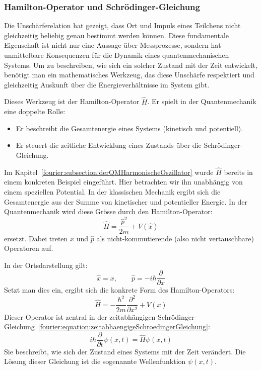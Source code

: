 	\subsubsection{Hamilton-Operator und Schrödinger-Gleichung%
	\label{fourier:subsubsection:hamiltonOperatorUndSchroedinger}}
		Die Unschärferelation hat gezeigt, dass Ort und Impuls eines Teilchens nicht gleichzeitig beliebig genau bestimmt werden können.
		Diese fundamentale Eigenschaft ist nicht nur eine Aussage über Messprozesse,
		sondern hat unmittelbare Konsequenzen für die Dynamik eines quantenmechanischen Systems.
		Um zu beschreiben, wie sich ein solcher Zustand mit der Zeit entwickelt,
		benötigt man ein mathematisches Werkzeug, das diese Unschärfe respektiert
		und gleichzeitig Auskunft über die Energieverhältnisse im System gibt.
		
		Dieses Werkzeug ist der Hamilton-Operator \( \hat{H} \).
		Er spielt in der Quantenmechanik eine doppelte Rolle:
		\begin{itemize}
		\item Er beschreibt die Gesamtenergie eines Systems (kinetisch und potentiell).
		\item Er steuert die zeitliche Entwicklung eines Zustands über die Schrödinger-Gleichung.
		\end{itemize}
		Im Kapitel~\ref{fourier:subsection:derQMHarmonischeOszillator} wurde \( \hat{H} \) bereits in einem konkreten Beispiel eingeführt.
		Hier betrachten wir ihn unabhängig von einem speziellen Potential.
		In der klassischen Mechanik ergibt sich die Gesamtenergie aus der Summe von kinetischer und potentieller Energie.
		In der Quantenmechanik wird diese Grösse durch den Hamilton-Operator:
		\begin{equation}\label{fourier:equation:HamiltonOperatorQM}
			\hat{H} = \frac{\hat{p}^2}{2m} + V(\hat{x})
		\end{equation}
		ersetzt.
		Dabei treten \( \hat{x} \) und \( \hat{p} \) als nicht-kommutierende (also nicht vertauschbare) Operatoren auf.
		
		In der Ortsdarstellung gilt:
		\begin{equation}
			\hat{x} = x, \qquad \hat{p} = -i\hbar \frac{\partial}{\partial x}
		\end{equation}
		Setzt man dies ein, ergibt sich die konkrete Form des Hamilton-Operators:
		\begin{equation}
			\hat{H} = -\frac{\hbar^2}{2m} \frac{\partial^2}{\partial x^2} + V(x)
		\end{equation}
		Dieser Operator ist zentral in der zeitabhängigen Schrödinger-Gleichung~\ref{fourier:equation:zeitabhaengigeSchroedingerGleichung}:
		\begin{equation}
			i\hbar \frac{\partial}{\partial t} \psi(x,t) = \hat{H} \psi(x,t)
		\end{equation}
		Sie beschreibt, wie sich der Zustand eines Systems mit der Zeit verändert.
		Die Lösung dieser Gleichung ist die sogenannte Wellenfunktion \( \psi(x,t) \).

